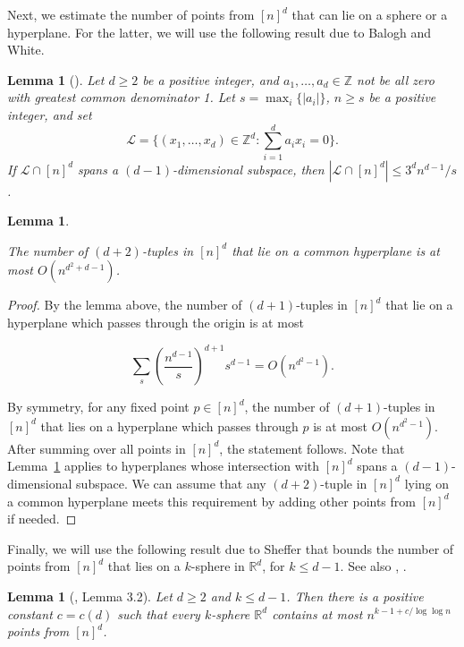 \documentclass[11pt]{article}
\theoremstyle{plain}
\newtheorem{lemma}[theorem]{Lemma}
\theoremstyle{definition}
\theoremstyle{remark}
\begin{document}
Next, we estimate the number of points from $[n]^d$ that can lie on a sphere or a hyperplane.  For the latter, we will use the following result due to Balogh and White.





\begin{lemma}[\cite{balogh}]\label{hyperplaneBound} 
Let $d \geq 2$ be a positive integer, and $a_1,\ldots,a_d \in \mathbb{Z}$ not be all zero with greatest common denominator 1. Let $s = \max_i\{|a_i|\}$, $n \geq s$ be a positive integer, and set
\[ \mathcal{L} = \{ (x_1,\ldots,x_d) \in \mathbb{Z}^d \colon \sum_{i=1}^d a_ix_i = 0 \}.\]
If $\mathcal{L} \cap [n]^d$ spans a $(d-1)$-dimensional subspace, then $|\mathcal{L} \cap [n]^d| \leq 3^dn^{d-1}/s$. 
    
\end{lemma}


\begin{lemma}\label{cohyperplaneCount}

The number of $(d+2)$-tuples in $[n]^d$ that lie on a common hyperplane is at most $O(n^{d^2+d-1})$. 
    
\end{lemma}

\begin{proof} By the lemma above, the number of $(d+1)$-tuples in $[n]^d$ that lie on a hyperplane which passes through the origin is at most

    \[ \sum_s \left( \frac{n^{d-1}}{s} \right)^{d+1} s^{d-1} = O(n^{d^2 - 1}). \]

\noindent By symmetry, for any fixed point $p\in [n]^d$, the number of $(d+1)$-tuples in $[n]^d$ that lies on a hyperplane which passes through $p$ is at most  $O(n^{d^2 - 1}).$  After summing over all points in $[n]^d$, the statement follows. Note that Lemma~\ref{cohyperplaneCount} applies to hyperplanes whose intersection with $[n]^d$ spans a $(d-1)$-dimensional subspace. We can assume that any $(d+2)$-tuple in $[n]^d$ lying on a common hyperplane meets this requirement by adding other points from $[n]^d$ if needed.\end{proof} 


Finally, we will use the following result due to Sheffer that bounds the number of points from $[n]^d$ that lies on a $k$-sphere in $\mathbb{R}^d$, for $k \leq d-1$.  See also \cite[Sec.~11.2, Equation~11.9]{iwaniec}, \cite[Theorem~2]{shel}.

 


\begin{lemma}[\cite{sheffer}, Lemma 3.2]\label{simplepoorCircles} Let $d \geq 2$ and $k\leq d-1$. 
 Then there is a positive constant $c = c(d)$ such that every $k$-sphere $\mathbb{R}^d$ contains at most $n^{k-1 + c/\log\log n }$ points from $[n]^d$.  
    
\end{lemma}
\end{document}
